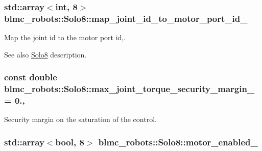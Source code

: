 \subsubsection[{\texorpdfstring{map\+\_\+joint\+\_\+id\+\_\+to\+\_\+motor\+\_\+port\+\_\+id\+\_\+}{map_joint_id_to_motor_port_id_}}]{\setlength{\rightskip}{0pt plus 5cm}std\+::array$<$int, 8$>$ blmc\+\_\+robots\+::\+Solo8\+::map\+\_\+joint\+\_\+id\+\_\+to\+\_\+motor\+\_\+port\+\_\+id\+\_\+\hspace{0.3cm}{\ttfamily [private]}}\hypertarget{classblmc__robots_1_1Solo8_a6c1a5948cf6d2ec18d619753d51b8546}{}\label{classblmc__robots_1_1Solo8_a6c1a5948cf6d2ec18d619753d51b8546}


Map the joint id to the motor port id,. 

\begin{DoxySeeAlso}{See also}
\hyperlink{classblmc__robots_1_1Solo8}{Solo8} description. 
\end{DoxySeeAlso}
\subsubsection[{\texorpdfstring{max\+\_\+joint\+\_\+torque\+\_\+security\+\_\+margin\+\_\+}{max_joint_torque_security_margin_}}]{\setlength{\rightskip}{0pt plus 5cm}const double blmc\+\_\+robots\+::\+Solo8\+::max\+\_\+joint\+\_\+torque\+\_\+security\+\_\+margin\+\_\+ = 0.\hspace{0.3cm}{\ttfamily [static]}, {\ttfamily [private]}}\hypertarget{classblmc__robots_1_1Solo8_addc990242a0e96c40edc629883541be7}{}\label{classblmc__robots_1_1Solo8_addc990242a0e96c40edc629883541be7}


Security margin on the saturation of the control. 

\subsubsection[{\texorpdfstring{motor\+\_\+enabled\+\_\+}{motor_enabled_}}]{\setlength{\rightskip}{0pt plus 5cm}std\+::array$<$bool, 8$>$ blmc\+\_\+robots\+::\+Solo8\+::motor\+\_\+enabled\+\_\+\hspace{0.3cm}{\ttfamily [private]}}\hypertarget{classblmc__robots_1_1Solo8_a8966f925be4af6937b4544cb5dbc8eab}{}\label{classblmc__robots_1_1Solo8_a8966f925be4af6937b4544cb5dbc8eab}



